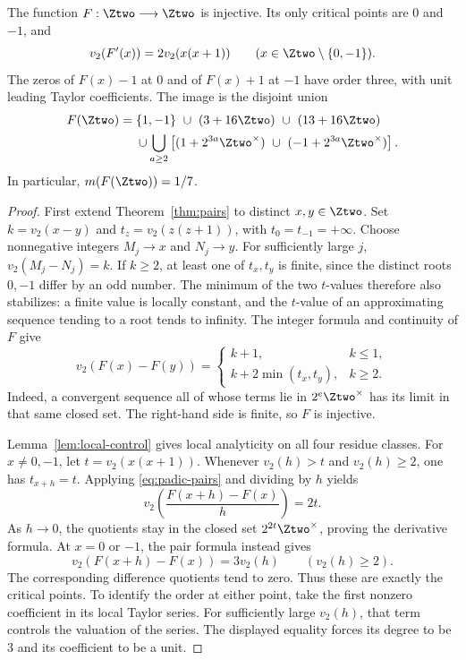 \begin{theorem}\label{thm:image}
The function $F:\Ztwo\longrightarrow\Ztwo$ is injective. Its only
critical points are $0$ and $-1$, and
\[
 v_2(F'(x))=2v_2(x(x+1))\qquad(x\in\Ztwo\setminus\{0,-1\}).
\]
The zeros of $F(x)-1$ at $0$ and of $F(x)+1$ at $-1$ have order
three, with unit leading Taylor coefficients. The image is the
disjoint union
\begin{align}
 F(\Ztwo)={}&\{1,-1\}\ \cup\ (3+16\Ztwo)\ \cup\ (13+16\Ztwo)
 \notag\\
 &{}\cup\bigcup_{a\ge2}
 \left[(1+2^{3a}\Ztwo^\times)\ \cup\
       (-1+2^{3a}\Ztwo^\times)\right].\label{eq:exact-image}
\end{align}
In particular, $m(F(\Ztwo))=1/7$.
\end{theorem}
\begin{proof}
First extend Theorem~\ref{thm:pairs} to distinct $x,y\in\Ztwo$.
Set $k=v_2(x-y)$ and $t_z=v_2(z(z+1))$, with
$t_0=t_{-1}=+\infty$. Choose nonnegative integers $M_j\to x$ and
$N_j\to y$. For sufficiently large $j$, $v_2(M_j-N_j)=k$. If
$k\ge2$, at least one of $t_x,t_y$ is finite, since the distinct
roots $0,-1$ differ by an odd number. The minimum of the two
$t$-values therefore also stabilizes: a finite value is locally
constant, and the $t$-value of an approximating sequence tending to
a root tends to infinity. The integer formula and continuity of $F$
give
\[
 v_2(F(x)-F(y))=
 \begin{cases}
 k+1,& k\le1,\\
 k+2\min(t_x,t_y),& k\ge2.
 \end{cases}\label{eq:padic-pairs}\tag{\theequation}
\]
Indeed, a convergent sequence all of whose terms lie in
$2^e\Ztwo^\times$ has its limit in that same closed set. The
right-hand side is finite, so $F$ is injective.

Lemma~\ref{lem:local-control} gives local analyticity on all four
residue classes. For $x\ne0,-1$, let $t=v_2(x(x+1))$. Whenever
$v_2(h)>t$ and $v_2(h)\ge2$, one has $t_{x+h}=t$. Applying
\eqref{eq:padic-pairs} and dividing by $h$ yields
\[
 v_2\left(\frac{F(x+h)-F(x)}{h}\right)=2t.
\]
As $h\to0$, the quotients stay in the closed set
$2^{2t}\Ztwo^\times$, proving the derivative formula. At $x=0$ or
$-1$, the pair formula instead gives
\[
 v_2(F(x+h)-F(x))=3v_2(h)\qquad(v_2(h)\ge2).
\]
The corresponding difference quotients tend to zero. Thus these are
exactly the critical points. To identify the order at either point,
take the first nonzero coefficient in its local Taylor series. For
sufficiently large $v_2(h)$, that term controls the valuation of the
series. The displayed equality forces its degree to be $3$ and its
coefficient to be a unit.


\end{proof}
